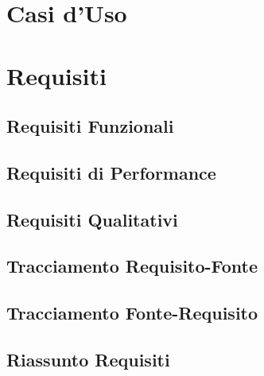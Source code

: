 \documentclass[a4paper,titlepage]{article}
\begin{document}
\tabulinesep=1.2mm

\maketitle

\begin{diario}
\end{diario}

\newpage
\tableofcontents

\newpage


\newpage


\newpage
\section{Casi d'Uso}
\label{sec:CasiUso}


\newpage


\newpage
\section{Requisiti}
\label{sec:Requisiti}


\newpage
\subsection{Requisiti Funzionali}
\label{sub:Requisiti Funzionali}


\newpage
\subsection{Requisiti di Performance}
\label{sub:Requisiti di Performance}


\newpage
\subsection{Requisiti Qualitativi}
\label{sub:Requisiti Qualitativi}


\newpage
\subsection{Tracciamento Requisito-Fonte}
\label{sub:Tracciamento Requisito-Fonte}


\newpage
\subsection{Tracciamento Fonte-Requisito}
\label{sub:Tracciamento Fonte-Requisito}


\newpage
\subsection{Riassunto Requisiti}
\label{sub:Riassunto Requisiti}

\end{document}
